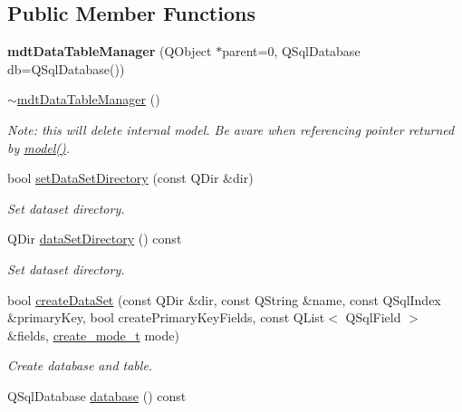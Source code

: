 \subsection*{Public Member Functions}
\begin{DoxyCompactItemize}
\item 
\hypertarget{classmdt_data_table_manager_ae63e559f597ae48a36e149afde3a8396}{
{\bfseries mdtDataTableManager} (QObject $\ast$parent=0, QSqlDatabase db=QSqlDatabase())}
\label{classmdt_data_table_manager_ae63e559f597ae48a36e149afde3a8396}

\item 
\hyperlink{classmdt_data_table_manager_a3a1c225b1aeedad8fc89b126147971ca}{$\sim$mdtDataTableManager} ()
\begin{DoxyCompactList}\small\item\em Note: this will delete internal model. Be avare when referencing pointer returned by \hyperlink{classmdt_data_table_manager_a4033591be8c92f6806363515bad9413f}{model()}. \end{DoxyCompactList}\item 
bool \hyperlink{classmdt_data_table_manager_a1e19b3f34c1b0a91bcae4396731efc57}{setDataSetDirectory} (const QDir \&dir)
\begin{DoxyCompactList}\small\item\em Set dataset directory. \end{DoxyCompactList}\item 
QDir \hyperlink{classmdt_data_table_manager_a8fa0924a76e8f3fec9617f690cc4e148}{dataSetDirectory} () const 
\begin{DoxyCompactList}\small\item\em Set dataset directory. \end{DoxyCompactList}\item 
bool \hyperlink{classmdt_data_table_manager_a6d07e713a18c4d1d3f0c005dd9f77ade}{createDataSet} (const QDir \&dir, const QString \&name, const QSqlIndex \&primaryKey, bool createPrimaryKeyFields, const QList$<$ QSqlField $>$ \&fields, \hyperlink{classmdt_data_table_manager_a2bccf081737f3237ecdbe346dba559a8}{create\_\-mode\_\-t} mode)
\begin{DoxyCompactList}\small\item\em Create database and table. \end{DoxyCompactList}\item 
\hypertarget{classmdt_data_table_manager_a9026c9d3d102246af243b68c815fba04}{
QSqlDatabase \hyperlink{classmdt_data_table_manager_a9026c9d3d102246af243b68c815fba04}{database} () const }
\label{classmdt_data_table_manager_a9026c9d3d102246af243b68c815fba04}


\end{DoxyCompactItemize}
